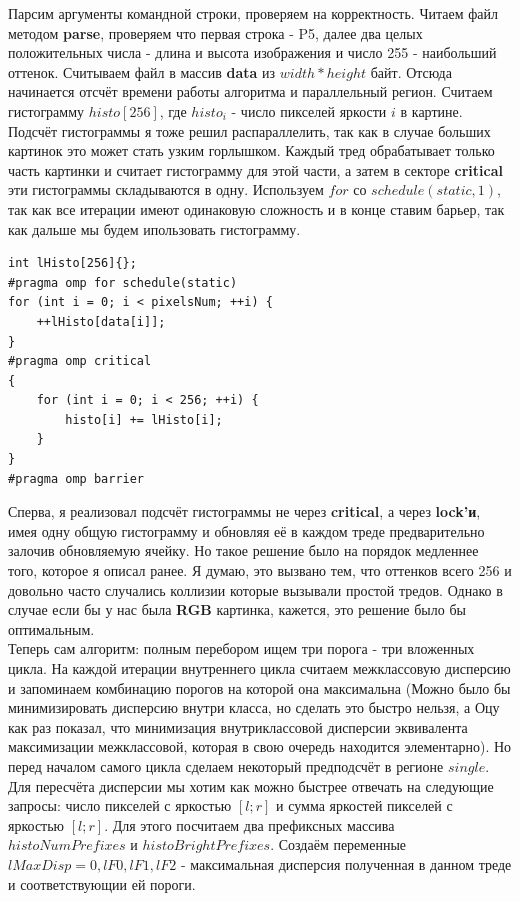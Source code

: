 \documentclass{article}
\begin{document}
Парсим аргументы командной строки, проверяем на корректность. Читаем файл методом \textbf{parse}, проверяем что первая строка - P5, далее два целых положительных числа - длина и высота изображения и число 255 - наибольший оттенок. Считываем файл в массив  \textbf{data} из $width*height$ байт. Отсюда начинается отсчёт времени работы алгоритма и параллельный регион. Считаем гистограмму $histo[256]$, где \textbf{$histo_i$} - число пикселей яркости $i$ в картине. Подсчёт гистограммы я тоже решил распараллелить, так как в случае больших картинок это может стать узким горлышком. Каждый тред обрабатывает только часть картинки и считает гистограмму для этой части, а затем в секторе \textbf{critical} эти гистограммы складываются в одну. Используем $for$ со $schedule(static, 1)$, так как все итерации имеют одинаковую сложность и в конце ставим барьер, так как дальше мы будем ипользовать гистограмму.
\begin{lstlisting}[label=histo-calc,caption=Подсчёт гистограммы]
int lHisto[256]{};
#pragma omp for schedule(static)
for (int i = 0; i < pixelsNum; ++i) {
	++lHisto[data[i]];
}
#pragma omp critical
{
	for (int i = 0; i < 256; ++i) {
		histo[i] += lHisto[i];
	}
}
#pragma omp barrier
\end{lstlisting}
Сперва, я реализовал подсчёт гистограммы не через \textbf{critical}, а через \textbf{lock'и}, имея одну общую гистограмму и обновляя её в каждом треде предварительно залочив обновляемую ячейку. Но такое решение было на порядок медленнее того, которое я описал ранее. Я думаю, это вызвано тем, что оттенков всего 256 и довольно часто случались коллизии которые вызывали простой тредов. Однако в случае если бы у нас была \textbf{RGB} картинка, кажется, это решение было бы оптимальным.\\Теперь сам алгоритм: полным перебором ищем три порога - три вложенных цикла. На каждой итерации внутреннего цикла считаем межклассовую дисперсию и запоминаем комбинацию порогов на которой она максимальна (Можно было бы минимизировать дисперсию внутри класса, но сделать это быстро нельзя, а Оцу как раз показал, что минимизация внутриклассовой дисперсии эквивалента максимизации межклассовой, которая в свою очередь находится элементарно).  Но перед началом самого цикла сделаем некоторый предподсчёт в регионе $single$. Для пересчёта дисперсии мы хотим как можно быстрее отвечать на следующие запросы: число пикселей с яркостью $[l ; r]$ и сумма яркостей пикселей с яркостью $[l ; r]$. Для этого посчитаем два префиксных массива $histoNumPrefixes$ и $histoBrightPrefixes$. Создаём переменные $lMaxDisp = 0, lF0, lF1, lF2$ - максимальная дисперсия полученная в данном треде и соответствующии ей пороги.
\end{document}
